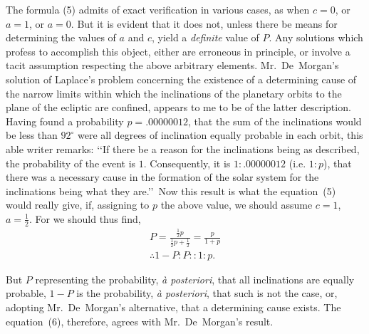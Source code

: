 \documentclass[oneside]{book}
\begin{document}
The formula (5) admits of exact verification in various cases,
as when $c = 0$, or $a = 1$, or $a = 0$. But it is evident that it does
not, unless there be means for determining the values of $a$ and $c$,
yield a \emph{definite} value of $P$. Any solutions which profess to accomplish this object, either are erroneous in principle, or involve
a tacit assumption respecting the above arbitrary elements. Mr.\
De~Morgan's solution of Laplace's problem concerning the existence of a determining cause of the narrow limits within which
the inclinations of the planetary orbits to the plane of the ecliptic
are confined, appears to me to be of the latter description. Having
found a probability $p =.00000012$, that the sum of the inclinations would
be less than $92^\circ$ were all degrees of inclination
equally probable in each orbit, this able writer remarks: \lq\lq If
there be a reason for the inclinations being as described, the
probability of the event is $1$. Consequently, it is
$1 \colon .00000012$
(i.e. $1 \colon p$), that there was a necessary cause in the formation of
the solar system for the inclinations being what they are.\rq\rq\ Now
this result is what the equation~(5) would really give, if, assigning
to $p$ the above value, we should assume $c = 1$, $a =\frac{1}{2}$. For we
should thus find,
\begin{gather*}
  P = \frac{ \frac{1}{2}p }{ \frac{1}{2}p + \frac{1}{2} } = \frac{p}{1+p}   \\
  \therefore 1 - P \colon P \colon\colon 1 \colon p.    \tag{6}
\end{gather*}

But $P$ representing the probability, \textit{\`{a} posteriori}, that all
inclinations are equally probable, $1 - P$ is the probability, \textit{\`{a} posteriori},
that such is not the case, or, adopting Mr.\ De~Morgan's
alternative, that a determining cause exists. The equation~(6),
therefore, agrees with Mr.\ De~Morgan's result.
\end{document}
